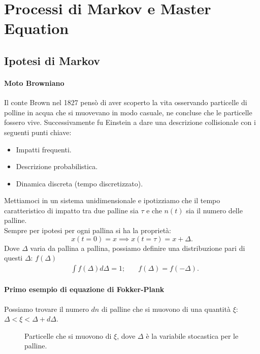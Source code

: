 \section{Processi di Markov e Master Equation}%
\label{sub:Lezione 1}
\mylocaltoc
\subsection{Ipotesi di Markov}%
\paragraph{Moto Browniano}
Il conte Brown nel 1827 pensò di aver scoperto la vita osservando particelle di polline in acqua che si muovevano in modo casuale, ne concluse che le particelle fossero vive. Successivamente fu Einstein a dare una descrizione collisionale con i seguenti punti chiave:
\begin{itemize}
    \item Impatti frequenti.
    \item Descrizione probabilistica.
    \item Dinamica discreta (tempo discretizzato).
\end{itemize}
Mettiamoci in un sistema unidimensionale e ipotizziamo che il tempo caratteristico di impatto tra due palline sia $\tau$ e che $n(t)$ sia il numero delle palline.\\
Sempre per ipotesi per ogni pallina si ha la proprietà:
\[
    x(t=0) = x \implies  x(t=\tau) = x + \Delta
.\] 
Dove $\Delta$ varia da pallina a pallina, possiamo definire una distribuzione pari di questi $\Delta$: $f(\Delta)$
\[\begin{aligned}
    &\int f(\Delta) d\Delta = 1; \quad &f(\Delta) = f(-\Delta) 
.\end{aligned}\]
\paragraph{Primo esempio di equazione di Fokker-Plank}%
Possiamo trovare il numero $dn$ di palline che si muovono di una quantità $\xi$: $\Delta < \xi < \Delta  + d\Delta$.
\begin{figure}[H]
    \centering
    \caption{\scriptsize Particelle che si muovono di $\xi$, dove $\Delta$ è la variabile stocastica per le palline.}
    \label{fig:1-brown}
\end{figure}
\noindent

